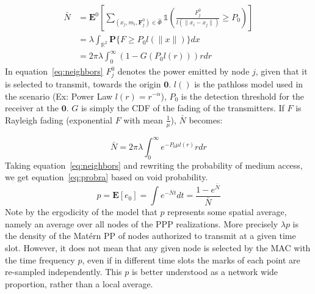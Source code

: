 %
\begin{equation}\label{eq:neighbors}
  \begin{split}
  \bar{N} &= \textbf{E}^0[\sum_{(x_j,m_i,\textbf{F}_j^0)\in\hat{\Phi}}\mathbb{1}(\frac{F_j^0}{l(\|x_i-x_j\|)}\geq P_0)] \\
  &= \lambda\int_{\mathbb{R}^2} \textbf{P}\{F\geq P_0l(\|x\|) \}dx \\
  &= 2\pi \lambda \int_0^\infty (1-G(P_0l(r)))rdr
\end{split}
\end{equation}
%
In equation~\eqref{eq:neighbors} $F_j^0$ denotes the power emitted by node $j$, given that it is selected to transmit, towards the origin $\textbf{0}$.  $l()$ is the pathloss model used in the scenario (Ex: Power Law $l(r)=r^{-\alpha}$),  $P_0$ is the detection threshold for the receiver at the $\textbf{0}$.  $G$ is simply the CDF of the fading of the transmitters.  If $F$ is Rayleigh fading (exponential $F$ with mean $\frac{1}{\mu}$), $\bar{N}$ becomes:\par
%
\begin{equation}
  \bar{N} = 2 \pi \lambda \int_0^\infty  e^{-P_0 \mu l(r)} r dr
\end{equation}
%
Taking equation~\eqref{eq:neighbors} and rewriting the probability of medium access, we get equation~\eqref{eq:probra} based on void probability.
%
\begin{equation}\label{eq:probra}
  p = \textbf{E}[e_0] = \int e^{-\bar{N}t} dt= \frac{1-e^{\bar{N}}}{\bar{N}}
\end{equation}
%
Note by the ergodicity of the model that $p$ represents some spatial average, namely an average over all nodes of the PPP realizations. More precisely $\lambda p$ is the density of the Mat\'ern PP of nodes authorized to transmit at a given time slot. However, it does not mean that any given
node is selected by the MAC with the time frequency $p$, even if in different time slots the marks of each point are re-sampled independently.  This $p$ is better understood as a network wide proportion, rather than a local average.

